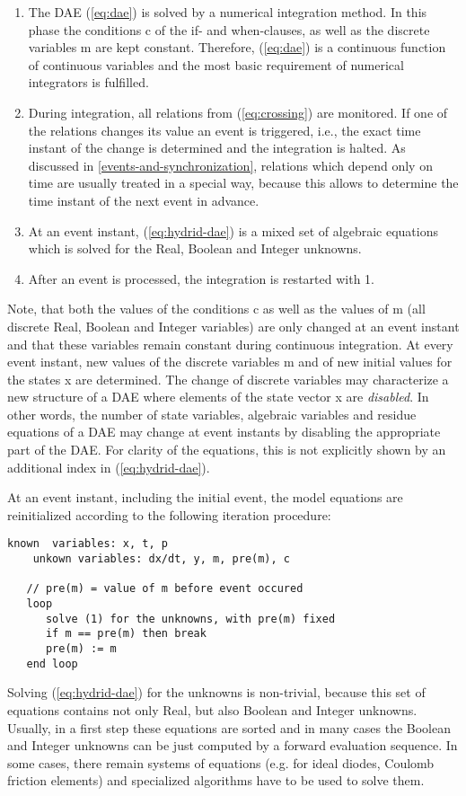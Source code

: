 \begin{enumerate}
\item
  The DAE (\ref{eq:dae}) is solved by a numerical integration method. In this
  phase the conditions c of the if- and when-clauses, as well as the
  discrete variables m are kept constant. Therefore, (\ref{eq:dae}) is a
  continuous function of continuous variables and the most basic
  requirement of numerical integrators is fulfilled.
\item
  During integration, all relations from (\ref{eq:crossing}) are monitored. If one of
  the relations changes its value an event is triggered, i.e., the exact
  time instant of the change is determined and the integration is
  halted. As discussed in \autoref{events-and-synchronization}, relations which depend only on
  time are usually treated in a special way, because this allows to
  determine the time instant of the next event in advance.
\item
  At an event instant, (\ref{eq:hydrid-dae}) is a mixed set of algebraic equations which
  is solved for the Real, Boolean and Integer unknowns.
\item
  After an event is processed, the integration is restarted with 1.
\end{enumerate}

Note, that both the values of the conditions c as well as the values of
m (all discrete Real, Boolean and Integer variables) are only changed at
an event instant and that these variables remain constant during
continuous integration. At every event instant, new values of the
discrete variables m and of new initial values for the states x are
determined. The change of discrete variables may characterize a new
structure of a DAE where elements of the state vector x are
\emph{disabled}. In other words, the number of state variables,
algebraic variables and residue equations of a DAE may change at event
instants by disabling the appropriate part of the DAE. For clarity of
the equations, this is not explicitly shown by an additional index in
(\ref{eq:hydrid-dae}).

At an event instant, including the initial event, the model equations
are reinitialized according to the following iteration procedure:

\begin{lstlisting}[language=modelica]
    known  variables: x, t, p
    unkown variables: dx/dt, y, m, pre(m), c 

   // pre(m) = value of m before event occured
   loop
      solve (1) for the unknowns, with pre(m) fixed
      if m == pre(m) then break
      pre(m) := m    
   end loop 
\end{lstlisting}
Solving (\ref{eq:hydrid-dae}) for the unknowns is non-trivial, because this set of 
equations contains not only Real, but also Boolean and Integer unknowns.
Usually, in a first step these equations are sorted and in many cases
the Boolean and Integer unknowns can be just computed by a forward
evaluation sequence. In some cases, there remain systems of equations
(e.g. for ideal diodes, Coulomb friction elements) and specialized
algorithms have to be used to solve them.

